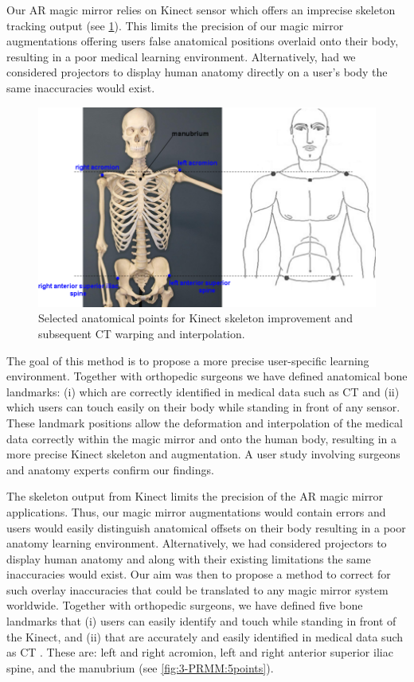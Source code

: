 Our AR magic mirror relies on Kinect sensor which offers an imprecise skeleton tracking output (see \figurename{\ref{fig:3-PRMM:bonelandmarker}}). This limits the precision of our magic mirror augmentations offering users false anatomical positions overlaid onto their body, resulting in a poor medical learning environment. Alternatively, had we considered projectors to display human anatomy directly on a user’s body the same inaccuracies would exist\cite{Sun2013}. 
\begin{figure}[htb]
	\centering
	\label{fig:3-PRMM:bonelandmarker}
	\includegraphics[width = 0.75\linewidth]{figures/3-PRMM/FiveBoneLandmarker.png}
	\caption{Selected anatomical points for Kinect skeleton improvement and subsequent CT warping and interpolation.}
\end{figure}

The goal of this method is to propose a more precise user-specific learning environment. Together with orthopedic surgeons we have defined anatomical bone landmarks: (i) which are correctly identified in medical data such as CT and (ii) which users can touch easily on their body while standing in front of any sensor. These landmark positions allow the deformation and interpolation of the medical data correctly within the magic mirror and onto the human body, resulting in a more precise Kinect skeleton and augmentation. A user study involving surgeons and anatomy experts confirm our findings. 

The skeleton output from Kinect limits the precision of the AR magic mirror applications. Thus, our magic mirror augmentations would contain errors and users would easily distinguish anatomical offsets on their body resulting in a poor anatomy learning environment. Alternatively, we had considered projectors to display human anatomy and along with their existing limitations the same inaccuracies would exist. Our aim was then to propose a method to correct for such overlay inaccuracies that could be translated to any magic mirror system worldwide. Together with orthopedic surgeons, we have defined five bone landmarks that (i) users can easily identify and touch while standing in front of the Kinect, and (ii) that are accurately and easily identified in medical data such as CT \cite{ma2013ismar}. These are: left and right acromion, left and right anterior superior iliac spine, and the manubrium (see \figurename{\ref{fig:3-PRMM:5points}}).


